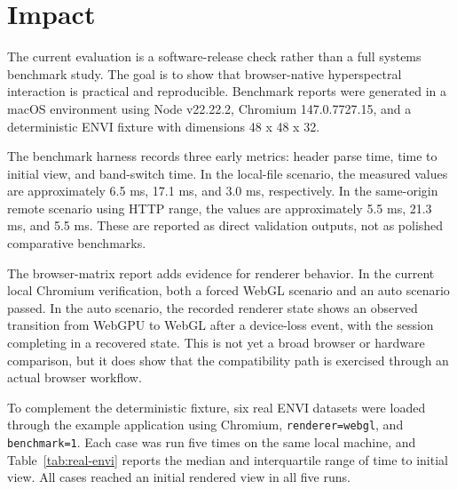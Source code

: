 \documentclass[preprint,12pt,a4paper]{elsarticle}
\begin{document}
\section{Impact}

The current evaluation is a software-release check rather than a full systems
benchmark study. The goal is to show that browser-native hyperspectral
interaction is practical and reproducible. Benchmark reports were generated in
a macOS environment using Node v22.22.2, Chromium 147.0.7727.15, and a
deterministic ENVI fixture with dimensions 48 x 48 x 32.

The benchmark harness records three early metrics: header parse time, time to
initial view, and band-switch time. In the local-file scenario, the measured
values are approximately 6.5 ms, 17.1 ms, and 3.0 ms, respectively. In the
same-origin remote scenario using HTTP range, the values are approximately
5.5 ms, 21.3 ms, and 5.5 ms. These are reported as direct validation outputs,
not as polished comparative benchmarks.

The browser-matrix report adds evidence for renderer behavior. In the current
local Chromium verification, both a forced WebGL scenario and an auto scenario
passed. In the auto scenario, the recorded renderer state shows an observed
transition from WebGPU to WebGL after a device-loss event, with the session
completing in a recovered state. This is not yet a broad browser or hardware
comparison, but it does show that the compatibility path is exercised through
an actual browser workflow.

To complement the deterministic fixture, six real ENVI datasets were loaded
through the example application using Chromium, \texttt{renderer=webgl}, and
\texttt{benchmark=1}. Each case was run five times on the same local machine,
and Table~\ref{tab:real-envi} reports the median and interquartile range of
time to initial view. All cases reached an initial rendered view in all five
runs.
\end{document}
